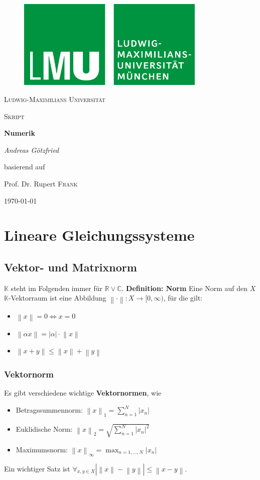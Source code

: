 \documentclass{article}
\newcommand\norm[1]{\left\lVert#1\right\rVert}
\begin{document}
\begin{titlepage}
\centering
    \begin{figure}
    \centering
	    \includegraphics[width=90mm]{logo_lmu.jpg}
    \end{figure}
	{\scshape\LARGE Ludwig-Maximilians Universität \par}
	\vspace{1cm}
	{\scshape\Large Skript \par}
	\vspace{1.5cm}
	{\huge\bfseries Numerik\par}
	\vspace{2cm}
	{\Large\itshape Andreas Götzfried\par}
    \vfill
	    basierend auf\par
	    Prof. Dr. Rupert \textsc{Frank}
    \vfill
	{\large \today\par}
\end{titlepage}
\tableofcontents{}

\newpage
\section{Lineare Gleichungssysteme}
\subsection{Vektor- und Matrixnorm}
    $\mathbb{K}$ steht im Folgenden immer für $\mathbb{R}\vee\mathbb{C}$.\newline
    \textbf{Definition: Norm}\newline
    Eine Norm auf den $X$ $\mathbb{K}$-Vektorraum ist eine Abbildung 
    $\norm{\cdot}:X\rightarrow[0,\infty)$, für die gilt:
    \begin{itemize}
        \item $\norm{x}=0 \Leftrightarrow x=0$
        \item $\norm{\alpha x}=|\alpha|\cdot \norm{x}$
        \item $\norm{x+y}\le \norm{x}+\norm{y}$
    \end{itemize}
\subsubsection{Vektornorm}
    Es gibt verschiedene wichtige \textbf{Vektornormen}, wie
    \begin{itemize}
        \item Betragssummennorm: $\norm{x}_1=\sum_{n=1}^N|x_n|$
        \item Euklidische Norm: $\norm{x}_2=\sqrt{\sum_{n=1}^N|x_n|^2}$
        \item Maximumsnorm: $\norm{x}_\infty=\max_{n=1,...,N}|x_n|$
    \end{itemize}
    Ein wichtiger Satz ist $\forall_{x,y\in X}|\norm{x}-\norm{y}|\le \norm{x-y}$.
\end{document}
